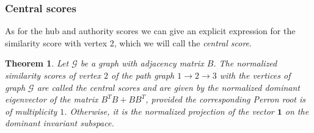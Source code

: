 \documentclass[a4paper,11pt]{report}
\newtheorem{theorem}{Theorem}[section]
\newcommand{\graf}{\mathscr{G}}
\begin{document}
\subsubsection{Central scores}
As for the hub and authority scores we can give an explicit expression for the 
similarity score with vertex $2$, which we will call the \emph{central score}. 
\begin{theorem}\label{centralescore}
  Let $\graf$ be a graph with adjacency matrix $B$. The normalized similarity scores of vertex $2$ 
  of the path graph $1 \to 2 \to 3$ with the vertices of graph $\graf$ are called the central 
  scores and are given by the normalized dominant eigenvector of the matrix 
  $B^TB+BB^T$, provided the corresponding Perron root is of multiplicity $1$. 
  Otherwise, it is the normalized projection of the vector $\mathbf{1}$ on the 
  dominant invariant subspace.
  \end{theorem}
  
\end{document}
